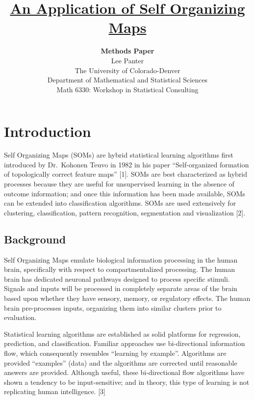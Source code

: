 \documentclass[12pt,]{article}
\title{\vspace{2in} \textbf{\underline{An Application of Self Organizing Maps}}}
\subtitle{\vspace{0.35in} \textbf{Methods Paper}\\
\vspace{0.25in} Lee Panter\\
\vspace{0.05in} The University of Colorado-Denver\\
\vspace{0.05in} Department of Mathematical and Statistical Sciences\\
\vspace{0.05in} Math 6330: Workshop in Statistical Consulting}
\author{}
\date{}
\begin{document}
\maketitle

\thispagestyle{empty}

\newpage

\thispagestyle{empty}

\setcounter{secnumdepth}{4}
\setcounter{tocdepth}{4}
\begin{singlespace}
\tableofcontents
\end{singlespace}

\newpage


\hypertarget{introduction}{%
\section{Introduction}\label{introduction}}

Self Organizing Maps (SOMs) are hybrid statistical learning algorithms
first introduced by Dr.~Kohonen Teuvo in 1982 in his paper
``Self-organized formation of topologically correct feature maps''
{[}1{]}. SOMs are best characterized as hybrid processes because they
are useful for unsupervised learning in the absence of outcome
information; and once this information has been made available, SOMs can
be extended into classification algorithms. SOMs are used extensively
for clustering, classification, pattern recognition, segmentation and
visualization {[}2{]}.

\hypertarget{background}{%
\subsection{Background}\label{background}}

Self Organizing Maps emulate biological information processing in the
human brain, specifically with respect to compartmentalized processing.
The human brain has dedicated neuronal pathways designed to process
specific stimuli. Signals and inputs will be processed in completely
separate areas of the brain based upon whether they have sensory,
memory, or regulatory effects. The human brain pre-processes inputs,
organizing them into similar clusters prior to evaluation.

Statistical learning algorithms are established as solid platforms for
regression, prediction, and classification. Familiar approaches use
bi-directional information flow, which consequently resembles ``learning
by example''. Algorithms are provided ``examples'' (data) and the
algorithms are corrected until reasonable answers are provided. Although
useful, these bi-directional flow algorithms have shown a tendency to be
input-sensitive; and in theory, this type of learning is not replicating
human intelligence. {[}3{]}
\end{document}
